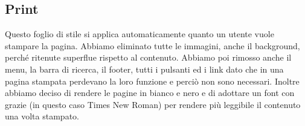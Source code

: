 \subsection{Print}
Questo foglio di stile si applica automaticamente quanto un utente vuole stampare la pagina. 
Abbiamo eliminato tutte le immagini, anche il background, perché ritenute superflue rispetto al contenuto. Abbiamo poi rimosso anche il menu, la barra di ricerca, il footer, tutti i pulsanti ed i link dato che in una pagina stampata perdevano la loro funzione e perciò non sono necessari. 
Inoltre abbiamo deciso di rendere le pagine in bianco e nero e di adottare un font con grazie (in questo caso Times New Roman) per rendere più leggibile il contenuto una volta stampato.



